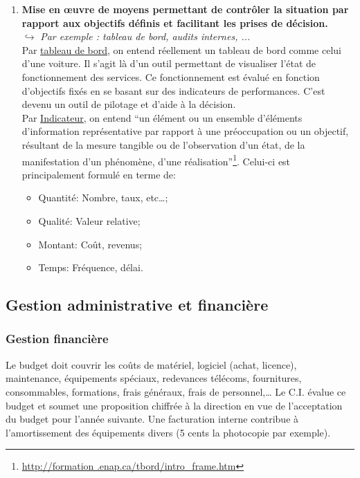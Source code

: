 \documentclass[10pt,a4paper,oneside,titlepage]{report}
\newcommand{\titre}[1]{\textcolor{title}{#1}}
\newcommand{\newterm}[1]{\textit{#1}}
\newcommand{\strong}[1]{\textbf{\titre{#1}}}
\begin{document}
\begin{enumerate}
\item \strong{Mise en \oe uvre de moyens permettant de contrôler la situation
par rapport aux objectifs définis et facilitant les prises de décision.} \\
$\hookrightarrow$ \newterm{Par exemple : tableau de bord, audits internes, ...
} \\
Par \underline{tableau de bord}, on entend réellement un tableau de bord comme
celui d'une voiture. Il s'agit là d'un outil permettant de visualiser l'état de
fonctionnement des services. Ce fonctionnement est évalué en fonction
d'objectifs fixés en se basant sur des indicateurs de performances. C'est devenu
un outil de pilotage et d'aide à la décision.\\

Par \underline{Indicateur}, on entend ``un élément ou un ensemble d’éléments
d’information représentative par rapport à une préoccupation ou un objectif,
résultant de la mesure tangible ou de l’observation d’un état, de la
manifestation d’un phénomène, d’une réalisation''\footnote{\url{http://formation
.enap.ca/tbord/intro_frame.htm}}. Celui-ci est principalement formulé en terme
de:
\begin{itemize}
\item Quantité: Nombre, taux, etc\dots;
\item Qualité: Valeur relative;
\item Montant: Coût, revenus;
\item Temps: Fréquence, délai.
\end{itemize}
\end{enumerate}

\subsection{Gestion administrative et financière}

\subsubsection{Gestion financière}

Le budget doit couvrir les coûts de matériel, logiciel (achat, licence),
maintenance, équipements spéciaux, redevances télécoms, fournitures,
consommables, formations, frais généraux, frais de personnel,\dots
Le C.I. évalue ce budget et soumet une proposition chiffrée à la direction en
vue de l'acceptation du budget pour l'année suivante. Une facturation interne
contribue à l'amortissement des équipements divers (5 cents la photocopie par
exemple).
\end{document}
